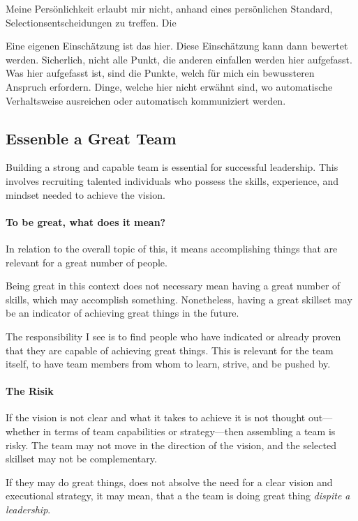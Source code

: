Meine Persönlichkeit erlaubt mir nicht, anhand eines persönlichen Standard, Selectionsentscheidungen zu treffen.
Die 

Eine eigenen Einschätzung ist das hier.
Diese Einschätzung kann dann bewertet werden.
Sicherlich, nicht alle Punkt, die anderen einfallen werden hier aufgefasst. 
Was hier aufgefasst ist, sind die Punkte, welch für mich ein bewussteren Anspruch erfordern. Dinge, welche hier nicht erwähnt sind, wo automatische Verhaltsweise ausreichen oder automatisch kommuniziert werden.


\subsection{Essenble a Great Team}
Building a strong and capable team is essential for successful leadership. This involves recruiting talented individuals who possess the skills, experience, and mindset needed to achieve the vision.


\paragraph{To be great, what does it mean?}
In relation to the overall topic of this, it means accomplishing things that are relevant for a great number of people.

Being great in this context does not necessary mean having a great number of skills, which may accomplish something. Nonetheless, having a great skillset may be an indicator of achieving great things in the future.

The responsibility I see is to find people who have indicated or already proven that they are capable of achieving great things. This is relevant for the team itself, to have team members from whom to learn, strive, and be pushed by.


\paragraph{The Risik}
If the vision is not clear and what it takes to achieve it is not thought out—whether in terms of team capabilities or strategy—then assembling a team is risky. The team may not move in the direction of the vision, and the selected skillset may not be complementary.


If they may do great things, does not absolve the need for a clear vision and executional strategy,  it may mean, that a the team is doing great thing \textit{dispite a leadership}.


